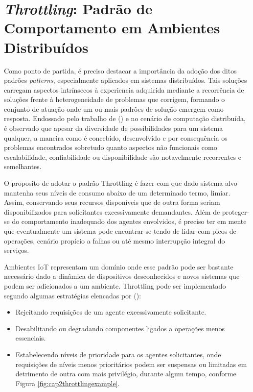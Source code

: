 \section{\textit{Throttling}: Padrão de Comportamento em Ambientes Distribuídos}
\label{cap2:throttling}

Como ponto de partida, é preciso destacar a importância da adoção dos ditos padrões \textit{patterns}, especialmente aplicados em sistemas distribuídos. Tais soluções carregam aspectos intrínsecos à experiencia adquirida mediante a recorrência de soluções frente à heterogeneidade de problemas que corrigem, formando o conjunto de atuação onde um ou mais padrões de solução emergem como resposta. Endossado pelo trabalho de \citeauthor{burns_designing_nodate} (\citeyear{burns_designing_nodate}) e no cenário de computação distribuída, é observado que apesar da diversidade de possibilidades para um sistema qualquer, a maneira como é concebido, desenvolvido e por consequência os problemas encontrados sobretudo quanto  aspectos não funcionais como escalabilidade, confiabilidade ou disponibilidade são notavelmente recorrentes e semelhantes. 

O proposito de adotar o padrão Throttling é fazer com que dado sistema alvo mantenha seus níveis de consumo abaixo de um determinado termo, limiar. Assim, conservando seus recursos disponíveis que de outra forma seriam disponibilizados para solicitantes excessivamente demandantes. Além de proteger-se do comportamento inadequado dos agentes envolvidos, é preciso ter em mente que eventualmente um sistema pode encontrar-se tendo de lidar com picos de operações, cenário propício a falhas ou até mesmo interrupção integral do serviços. 

Ambientes IoT representam um domínio onde esse padrão pode ser bastante necessário dado a dinâmica de dispositivos desconhecidos e novos sistemas que podem ser adicionados a um ambiente. Throttling pode ser implementado segundo algumas estratégias elencadas por \citeauthor{martinekuan_throttling_nodate} (\citeyear{martinekuan_throttling_nodate}):

\begin{itemize}
	\item Rejeitando requisições de um agente excessivamente solicitante.
	\item Desabilitando ou degradando componentes ligados a operações menos essenciais. 
	\item Estabelecendo níveis de prioridade para os agentes solicitantes, onde requisições de níveis menos prioritários podem ser suspensas ou limitadas em detrimento de outra com mais privilégio, durante algum tempo, conforme Figura \ref{fig:cap2throttlingexample}.
\end{itemize}

